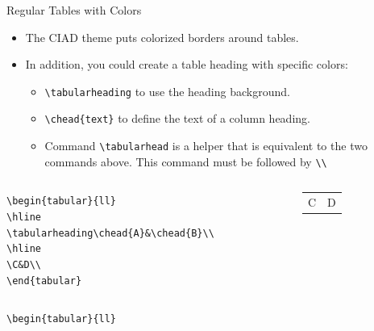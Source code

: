 \documentclass[english,sectioncirclenumberstyle]{ciadbeamer}
\begin{document}
\begin{frame}[t]{{Regular Tables} with Colors}
	\begin{itemize}
	\item The CIAD theme puts colorized borders around tables.
	\item In addition, you could create a table heading with specific colors:
		\begin{itemize}
		\item \texttt{{\textbackslash}tabularheading} to use the heading background.
		\item \texttt{{\textbackslash}chead\{text\}} to define the text of a column heading.
		\item Command \texttt{{\textbackslash}tabularhead} is a helper that is equivalent to the two commands above. This command must be followed by \texttt{{\textbackslash}{\textbackslash}}
		\end{itemize}
	\end{itemize}
	\begin{example}
		\begin{columns}
			\begin{column}{.6\linewidth}
				\scriptsize
				\texttt{{\textbackslash}begin\{tabular\}\{{\textbar}l{\textbar}l{\textbar}\}} \\
				\texttt{{\textbackslash}hline} \\
				\texttt{{\textbackslash}tabularheading{\textbackslash}chead\{A\}\&{\textbackslash}chead\{B\}{\textbackslash}{\textbackslash}} \\
				\texttt{{\textbackslash}hline} \\
				\texttt{{\textbackslash}C\&D{\textbackslash}{\textbackslash}} \\
				\texttt{{\textbackslash}end\{tabular\}}
			\end{column}
			\begin{column}{.3\linewidth}
				\begin{tabular}{|l|l|}
					\hline
					\tabularheading\chead{A}&\chead{B} \\
					\hline
					C & D \\
					\hline
				\end{tabular}	
			\end{column}
		\end{columns}
	\end{example}
		\begin{columns}
			\begin{column}{.6\linewidth}
				\scriptsize
				\texttt{{\textbackslash}begin\{tabular\}\{{\textbar}l{\textbar}l{\textbar}\}} \\

\end{column}
\end{columns}
\end{frame}
\end{document}
